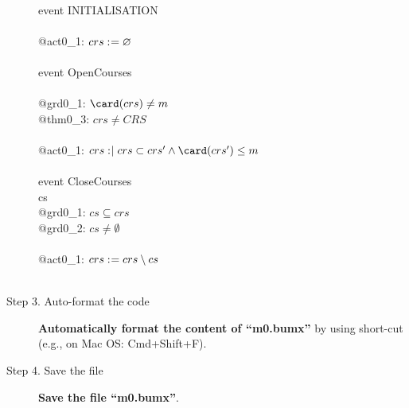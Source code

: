 \begin{description}
\begin{center}
\begin{Bcode}
      \Bevents\\
      \Btab event INITIALISATION\\
      \Btab \Bbegin \\
      \Btab\Btab @act0\_1: \(crs \mathrel{:\mkern1mu=} \mathord\varnothing\)\\
      \Btab \Bend\\
      \Btab event OpenCourses\\
      \Btab \Bwhere\\
      \Btab \Btab @grd0\_1: \(\card(crs) \neq m\) \\
      \Btab \Btab \Btheorem{} @thm0\_3: \(crs \neq CRS\) \\
      \Btab \Bthen\\
      \Btab \Btab @act0\_1: \(crs \bcmsuch crs \subset crs' \land \card(crs') \leq m\)\\
      \Btab \Bend\\
      \Btab \Banticipated{} event CloseCourses \\
      \Btab \Bany{} cs \Bwhere\\
      \Btab \Btab @grd0\_1: \(cs \subseteq crs\)\\
      \Btab \Btab @grd0\_2: \(cs \neq \emptyset\)\\
      \Btab \Bthen\\
      \Btab \Btab @act0\_1: \(crs \mathrel{:\mkern1mu=} crs \setminus cs\)\\
      \Btab \Bend\\
      \Bend
      \fi
    \end{Bcode}
  \end{center}
\item[Step 3. Auto-format the code] \textbf{Automatically format the content of ``m0.bumx''} by using short-cut (e.g., on Mac OS: Cmd+Shift+F).

\item[Step 4. Save the file] \textbf{Save the file ``m0.bumx''}.


\end{description}
